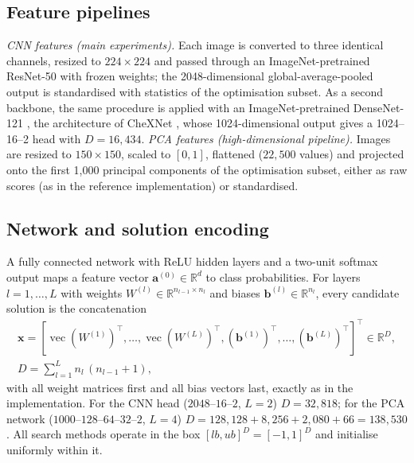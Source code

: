 \documentclass[10pt,letterpaper]{article}
\newcommand{\R}{\mathbb{R}}
\newcommand{\vecop}{\operatorname{vec}}
\begin{document}
\subsection{Feature pipelines}
\emph{CNN features (main experiments).} Each image is converted to three identical channels, resized to $224\times224$ and passed through an ImageNet-pretrained ResNet-50 \citep{he2016resnet,deng2009imagenet} with frozen weights; the 2048-dimensional global-average-pooled output is standardised with statistics of the optimisation subset. As a second backbone, the same procedure is applied with an ImageNet-pretrained DenseNet-121 \citep{huang2017densenet}, the architecture of CheXNet \citep{rajpurkar2017chexnet}, whose 1024-dimensional output gives a 1024--16--2 head with $D=16{,}434$.
\emph{PCA features (high-dimensional pipeline).} Images are resized to $150\times150$, scaled to $[0,1]$, flattened ($22{,}500$ values) and projected onto the first 1,000 principal components of the optimisation subset, either as raw scores (as in the reference implementation) or standardised.

\subsection{Network and solution encoding}
A fully connected network with ReLU hidden layers and a two-unit softmax output maps a feature vector $\mathbf{a}^{(0)}\in\R^{d}$ to class probabilities. For layers $l=1,\dots,L$ with weights $W^{(l)}\in\R^{n_{l-1}\times n_l}$ and biases $\mathbf{b}^{(l)}\in\R^{n_l}$, every candidate solution is the concatenation
\begin{equation}
\begin{gathered}
\mathbf{x}=\left[\vecop(W^{(1)})^{\top},\dots,\vecop(W^{(L)})^{\top},(\mathbf{b}^{(1)})^{\top},\dots,(\mathbf{b}^{(L)})^{\top}\right]^{\top}\in\R^{D},\\
D=\sum_{l=1}^{L}n_l\,(n_{l-1}+1),
\end{gathered}
\label{eq:encoding}
\end{equation}
with all weight matrices first and all bias vectors last, exactly as in the implementation. For the CNN head ($2048$--$16$--$2$, $L=2$) $D=32{,}818$; for the PCA network ($1000$--$128$--$64$--$32$--$2$, $L=4$) $D=128{,}128+8{,}256+2{,}080+66=138{,}530$. All search methods operate in the box $[lb,ub]^D=[-1,1]^D$ and initialise uniformly within it.
\end{document}
